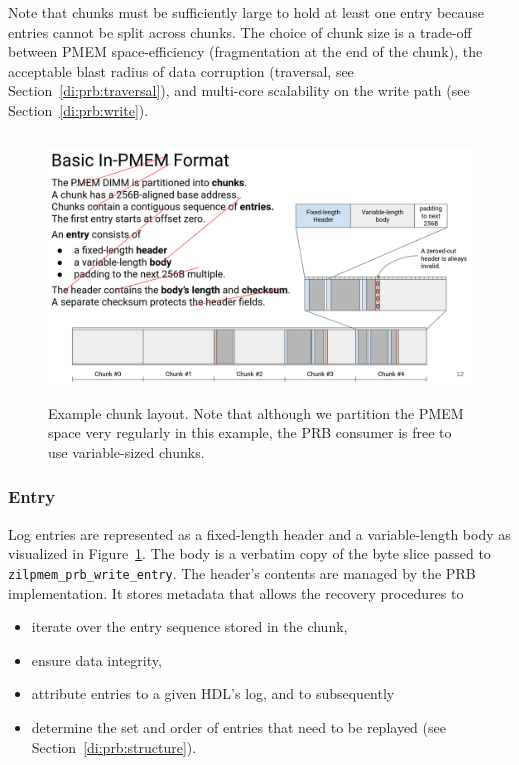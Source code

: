 \documentclass[12pt,a4paper,twoside]{book}
\begin{document}
Note that chunks must be sufficiently large to hold at least one entry because entries cannot be split across chunks.
The choice of chunk size is a trade-off between PMEM space-efficiency (fragmentation at the end of the chunk), the acceptable blast radius of data corruption (traversal, see Section~\ref{di:prb:traversal}), and multi-core scalability on the write path (see Section~\ref{di:prb:write}).

\begin{figure}[h]
    \includegraphics[height=7cm]{fig/prb_persistent_structure__chunklayout}
    \caption{Example chunk layout. Note that although we partition the PMEM space very regularly in this example, the PRB consumer is free to use variable-sized chunks.}
    \label{fig:prb_physical_data_structure__chunklayout}
\end{figure}

\subsubsection{Entry}
Log entries are represented as a fixed-length header and a variable-length body as visualized in Figure~\ref{fig:prb_physical_data_structure__chunklayout}.
The body is a verbatim copy of the byte slice passed to \lstinline{zilpmem_prb_write_entry}.
The header's contents are managed by the PRB implementation.
It stores metadata that allows the recovery procedures to
\begin{itemize}[noitemsep]
    \item iterate over the entry sequence stored in the chunk,
    \item ensure data integrity,
    \item attribute entries to a given HDL's log, and to subsequently
    \item determine the set and order of entries that need to be replayed (see Section~\ref{di:prb:structure}).
\end{itemize}
\end{document}
